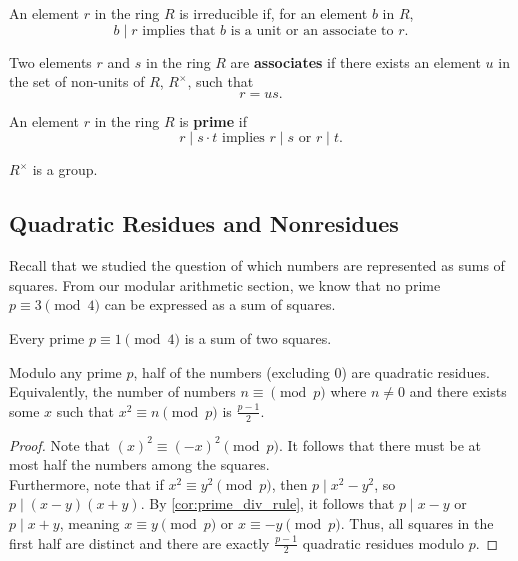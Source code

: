 \documentclass[11pt]{article}
\begin{document}
\begin{definition}[Irreducible]
An element $r$ in the ring $R$ is irreducible if, for an element $b$ in $R$, 
\[
    b \mid r \text{ implies that } b \text { is a unit or an associate to } r.
\]
\end{definition}

\begin{definition}[Associates]
Two elements $r$ and $s$ in the ring $R$ are \textbf{associates} if there exists an element $u$ in the set of non-units of $R$, $R^{\times}$, such that
\[
    r = us.
\]
\end{definition}

\begin{definition}[Prime]
An element $r$ in the ring $R$ is \textbf{prime} if 
\[
    r \mid s \cdot t \text{ implies } r \mid s \text{ or } r \mid t.
\]
\end{definition}


\begin{exercise}
$R^{\times}$ is a group.    
\end{exercise}

\subsection{Quadratic Residues and Nonresidues}

Recall that we studied the question of which numbers are represented as sums of squares. 
From our modular arithmetic section, we know that no prime $p \equiv 3 \pmod 4$ can be expressed as a sum of squares.

\begin{lemma}
Every prime $p \equiv 1 \pmod 4$ is a sum of two squares.
\end{lemma}

\begin{lemma}
Modulo any prime $p$, half of the numbers (excluding $0$) are quadratic residues. \\

Equivalently, the number of numbers $n \equiv \pmod p$ where
$n \neq 0$ and there exists some $x$ such that $x^2 \equiv n \pmod p$ is $\frac{p-1}{2}.$
\end{lemma}

\begin{proof}
Note that $(x)^2 \equiv (-x)^2 \pmod p$. It follows that there must be at most half the numbers among the squares. \\

Furthermore, note that if $x^2 \equiv y^2 \pmod p$, then $p \mid x^2 - y^2$, so $p \mid (x-y)(x+y)$. By \cref{cor:prime_div_rule}, it follows that
$p \mid x-y$ or $p \mid x+y$, meaning $x \equiv y \pmod p$ or $x \equiv -y \pmod p$. Thus, all squares in the first half are distinct and there are exactly
$\frac{p-1}{2}$ quadratic residues modulo $p$.
\end{proof}
\end{document}
